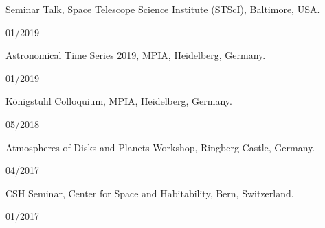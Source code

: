 \documentclass[12pt, a4paper]{article} %
\begin{document}
\begin{minipage}[t]{0.7\textwidth}
\begin{flushleft}%
  \setlength{\leftskip}{0.2cm}%
Seminar Talk, Space Telescope Science Institute (STScI), Baltimore, USA.
\end{flushleft}
\end{minipage}
\begin{minipage}[t]{0.3\textwidth}
\hfill 01/2019
\end{minipage}

\begin{minipage}[t]{0.7\textwidth}
\begin{flushleft}%
  \setlength{\leftskip}{0.2cm}%
Astronomical Time Series 2019, MPIA, Heidelberg, Germany.
\end{flushleft}
\end{minipage}
\begin{minipage}[t]{0.3\textwidth}
\hfill 01/2019
\end{minipage}

\begin{minipage}[t]{0.7\textwidth}
\begin{flushleft}%
  \setlength{\leftskip}{0.2cm}%
Königstuhl Colloquium, MPIA, Heidelberg, Germany.
\end{flushleft}
\end{minipage}
\begin{minipage}[t]{0.3\textwidth}
\hfill 05/2018
\end{minipage}

\begin{minipage}[t]{0.7\textwidth}
\begin{flushleft}%
  \setlength{\leftskip}{0.2cm}%
Atmospheres of Disks and Planets Workshop, Ringberg Castle, Germany.
\end{flushleft}
\end{minipage}
\begin{minipage}[t]{0.3\textwidth}
\hfill 04/2017
\end{minipage}

\begin{minipage}[t]{0.7\textwidth}
\begin{flushleft}%
  \setlength{\leftskip}{0.2cm}%
CSH Seminar, Center for Space and Habitability, Bern, Switzerland.
\end{flushleft}
\end{minipage}
\begin{minipage}[t]{0.3\textwidth}
\hfill 01/2017
\end{minipage}
\end{document}
